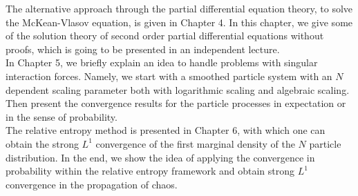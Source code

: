 The alternative approach through the partial differential equation theory, to solve the McKean-Vlasov equation, is given in Chapter 4. In this chapter, we give some of the solution theory of second order partial differential equations without proofs, which is going to be presented in an independent lecture.\\[1ex]
In Chapter 5, we briefly explain an idea to handle problems with singular interaction forces. Namely, we start with a smoothed particle system with an $N$ dependent scaling parameter both with logarithmic scaling and algebraic scaling. Then present the convergence results for the particle processes in expectation or in the sense of probability. \\[1ex]
The relative entropy method is presented in Chapter 6, with which one can obtain the strong $L^1$ convergence of the first marginal density of the $N$ particle distribution. In the end, we show the idea of applying the convergence in probability within the relative entropy framework and obtain strong $L^1$ convergence in the propagation of chaos. \\[1ex]

